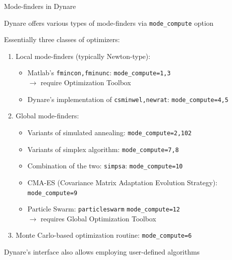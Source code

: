 \documentclass[handout,usepdftitle=false,xcolor=dvipsnames,aspectratio=169]{beamer}
\begin{document}
\begin{frame}{Mode-finders in Dynare}
  \begin{witemize}
    \item Dynare offers various types of mode-finders via \texttt{mode\_compute} option
    \item Essentially three classes of optimizers:\vspace{0.15cm}
    \begin{enumerate}
      \item Local mode-finders (typically Newton-type):
            \begin{itemize}
              \item Matlab's \texttt{fmincon,fminunc}: \texttt{mode\_compute=1,3}\\
                    $\rightarrow$ require Optimization Toolbox
              \item Dynare's implementation of \texttt{csminwel,newrat}: \texttt{mode\_compute=4,5}
            \end{itemize}\vspace{0.15cm}
      \item Global mode-finders:
            \begin{itemize}
              \item Variants of simulated annealing: \texttt{mode\_compute=2,102}
              \item Variants of simplex algorithm: \texttt{mode\_compute=7,8}
              \item Combination of the two: \texttt{simpsa}: \texttt{mode\_compute=10}
              \item CMA-ES (Covariance Matrix Adaptation Evolution Strategy): \texttt{mode\_compute=9}
              \item Particle Swarm: \texttt{particleswarm} \texttt{mode\_compute=12}\\
                    $\rightarrow$ requires Global Optimization Toolbox
            \end{itemize}\vspace{0.15cm}
      \item Monte Carlo-based optimization routine: \texttt{mode\_compute=6}
    \end{enumerate}
    \item Dynare's interface also allows employing user-defined algorithms
  \end{witemize}
\end{frame}
\end{document}
